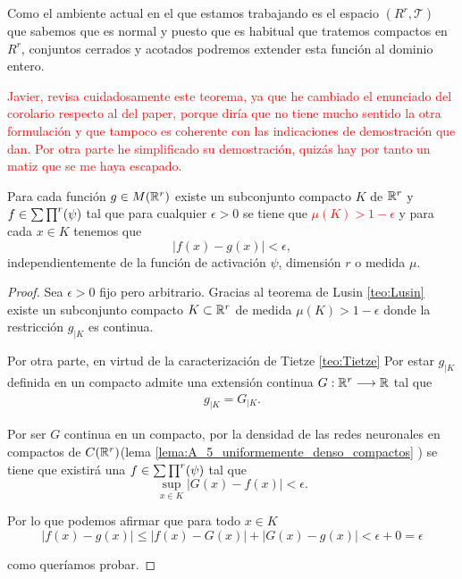 Como el ambiente actual en el que estamos trabajando 
es el espacio $(R^r, \mathcal{T})$ que sabemos que es normal y puesto que es habitual que tratemos compactos en $R^r$, conjuntos cerrados y acotados podremos extender esta función al dominio entero. 


\textcolor{red}{Javier, revisa cuidadosamente este teorema, ya que he cambiado el enunciado del corolario respecto al del paper, porque 
diría que no tiene mucho sentido la otra formulación y 
 que tampoco es coherente con las indicaciones de demostración
 que dan.
 Por otra parte he simplificado su demostración, quizás 
 hay por tanto un matiz que se me haya escapado. 
 }
\begin{corolario} \label{cor:2_1}
    Para cada función $g \in M(\mathbb{R}^r)$ existe un subconjunto compacto 
    $K$ de $\mathbb{R}^r$ y $f \in \sum \prod^r (\psi)$ tal que para cualquier 
    $\epsilon > 0$ se tiene que 
    \textcolor{red}{$\mu(K) > 1- \epsilon$} y para cada $x \in K$ tenemos que 
    \begin{equation}
        |f(x) - g(x) | < \epsilon,
    \end{equation}
    independientemente de la función de activación $\psi$, dimensión $r$ o medida $\mu$. 
\end{corolario}
\begin{proof}
    Sea $\epsilon > 0$ fijo pero arbitrario.  Gracias al teorema de Lusin \ref{teo:Lusin}
    existe un subconjunto compacto $K \subset \mathbb{R}^r$ de medida
    $\mu(K) > 1 - \epsilon$ donde la restricción  $g_{|K}$ es continua. 

    Por otra parte, en virtud de la caracterización de Tietze 
    \ref{teo:Tietze} 
    Por estar $g_{|K}$ definida en un compacto admite una 
    extensión continua $G:\mathbb{R}^r \longrightarrow \mathbb{R}$ tal que 
    \begin{equation}
        \begin{split}
            g_{|K} = G_{|K} .
        \end{split}
    \end{equation}

    Por ser $G$ continua en un compacto, por la densidad de las redes neuronales en compactos de $C(\mathbb{R}^r)$(lema \ref{lema:A_5_uniformemente_denso_compactos} ) se tiene que existirá 
    una $f \in \sum \prod^r (\psi)$ tal que 
    \begin{equation}
        \sup_{x \in K} |G(x) - f(x)| < \epsilon.
    \end{equation}

    Por lo que podemos afirmar que para todo $x \in K$
    \begin{equation}
        |f(x) -g(x)| 
        \leq 
        | f(x) -G(x)| + |G(x) -g(x)|
        < \epsilon + 0 = \epsilon
    \end{equation}

    como queríamos probar.
\end{proof}

